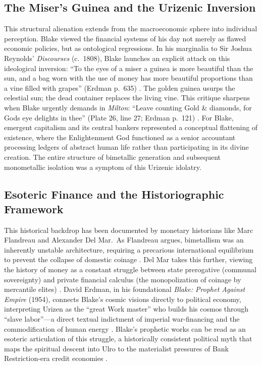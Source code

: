 \documentclass[
]{article}
\begin{document}
\subsection{The Miser's Guinea and the Urizenic
Inversion}\label{the-misers-guinea-and-the-urizenic-inversion}

This structural alienation extends from the macroeconomic sphere into
individual perception. Blake viewed the financial systems of his day not
merely as flawed economic policies, but as ontological regressions. In
his marginalia to Sir Joshua Reynolds' \emph{Discourses} (c.~1808),
Blake launches an explicit attack on this ideological inversion: ``To
the eyes of a miser a guinea is more beautiful than the sun, and a bag
worn with the use of money has more beautiful proportions than a vine
filled with grapes'' (Erdman p.~635) \citep{blake1808annotations}. The
golden guinea usurps the celestial sun; the dead container replaces the
living vine. This critique sharpens when Blake urgently demands in
\emph{Milton}: ``Leave counting Gold \& diamonds, for Gods eye delights
in thee'' (Plate 26, line 27; Erdman p.~121) \citep{erdman1988complete}.
For Blake, emergent capitalism and its central bankers represented a
conceptual flattening of existence, where the Enlightenment God
functioned as a senior accountant processing ledgers of abstract human
life rather than participating in its divine creation. The entire
structure of bimetallic generation and subsequent monometallic isolation
was a symptom of this Urizenic idolatry.

\subsection{Esoteric Finance and the Historiographic
Framework}\label{esoteric-finance-and-the-historiographic-framework}

This historical backdrop has been documented by monetary historians like
Marc Flandreau and Alexander Del Mar.~As Flandreau argues, bimetallism
was an inherently unstable architecture, requiring a precarious
international equilibrium to prevent the collapse of domestic coinage
\citep{flandreau1996bimetallism}. Del Mar takes this further, viewing
the history of money as a constant struggle between state prerogative
(communal sovereignty) and private financial calculus (the
monopolization of coinage by mercantile elites)
\citep{delmar1895history}. David Erdman, in his foundational
\emph{Blake: Prophet Against Empire} (1954), connects Blake's cosmic
visions directly to political economy, interpreting Urizen as the
``great Work master'' who builds his cosmos through ``slave labor''---a
direct textual indictment of imperial war-financing and the
commodification of human energy \citep{erdman1954prophet}. Blake's
prophetic works can be read as an esoteric articulation of this
struggle, a historically consistent political myth that maps the
spiritual descent into Ulro to the materialist pressures of Bank
Restriction-era credit economies
\citep{ferber2003politics, duty2000sublime}.
\end{document}
